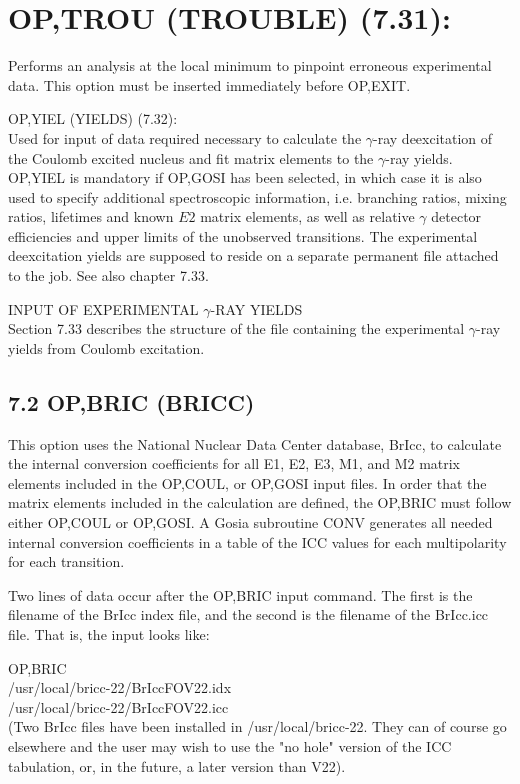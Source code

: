 \documentclass[10pt]{article}
\begin{document}
\section*{OP,TROU (TROUBLE) (7.31):}
Performs an analysis at the local minimum to pinpoint erroneous experimental data. This option must be inserted immediately before OP,EXIT.

OP,YIEL (YIELDS) (7.32):\\
Used for input of data required necessary to calculate the $\gamma$-ray deexcitation of the Coulomb excited nucleus and fit matrix elements to the $\gamma$-ray yields. OP,YIEL is mandatory if OP,GOSI has been selected, in which case it is also used to specify additional spectroscopic information, i.e. branching ratios, mixing ratios, lifetimes and known $E 2$ matrix elements, as well as relative $\gamma$ detector efficiencies and upper limits of the unobserved transitions. The experimental deexcitation yields are supposed to reside on a separate permanent file attached to the job. See also chapter 7.33.

INPUT OF EXPERIMENTAL $\gamma$-RAY YIELDS\\
Section 7.33 describes the structure of the file containing the experimental $\gamma$-ray yields from Coulomb excitation.

\subsection*{7.2 OP,BRIC (BRICC)}
This option uses the National Nuclear Data Center database, BrIcc, to calculate the internal conversion coefficients for all E1, E2, E3, M1, and M2 matrix elements included in the OP,COUL, or OP,GOSI input files. In order that the matrix elements included in the calculation are defined, the OP,BRIC must follow either OP,COUL or OP,GOSI. A Gosia subroutine CONV generates all needed internal conversion coefficients in a table of the ICC values for each multipolarity for each transition.

Two lines of data occur after the OP,BRIC input command. The first is the filename of the BrIcc index file, and the second is the filename of the BrIcc.icc file. That is, the input looks like:

OP,BRIC\\
/usr/local/bricc-22/BrIccFOV22.idx\\
/usr/local/bricc-22/BrIccFOV22.icc\\
(Two BrIcc files have been installed in /usr/local/bricc-22. They can of course go elsewhere and the user may wish to use the "no hole" version of the ICC tabulation, or, in the future, a later version than V22).
\end{document}
